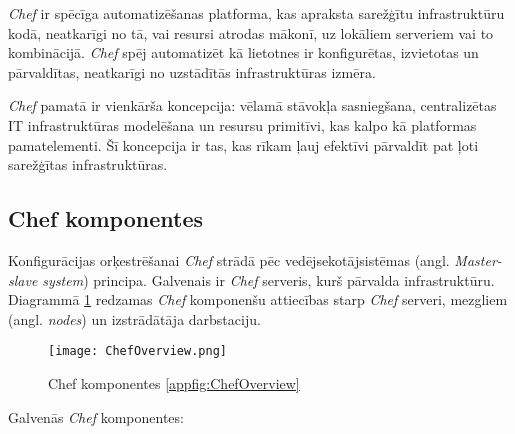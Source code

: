 \textit{Chef} ir spēcīga automatizēšanas platforma, kas apraksta sarežģītu infrastruktūru kodā, neatkarīgi no tā, vai resursi atrodas mākonī, uz lokāliem serveriem vai to kombinācijā. \textit{Chef} spēj automatizēt kā lietotnes ir konfigurētas, izvietotas un pārvaldītas, neatkarīgi no uzstādītās infrastruktūras izmēra.

\textit{Chef} pamatā ir vienkārša koncepcija: vēlamā stāvokļa sasniegšana, centralizētas IT infrastruktūras modelēšana un resursu primitīvi, kas kalpo kā platformas pamatelementi. Šī koncepcija ir tas, kas rīkam ļauj efektīvi pārvaldīt pat ļoti sarežģītas infrastruktūras. \cite{chef-docs}
\subsection{Chef komponentes}
Konfigurācijas orķestrēšanai \textit{Chef} strādā pēc vedējsekotājsistēmas (angl. \textit{Master-slave system}) principa. Galvenais ir \textit{Chef} serveris, kurš pārvalda infrastruktūru.
Diagrammā \ref{fig:ChefOverview} redzamas \textit{Chef} komponenšu attiecības starp \textit{Chef} serveri, mezgliem (angl. \textit{nodes}) un izstrādātāja darbstaciju. \cite{chef-docs}
\begin{figure}[H]%
	\centering
	\captionsetup{justification=centering}
	\texttt{[image: ChefOverview.png]}
	\caption{Chef komponentes \ref{appfig:ChefOverview}}
	\label{fig:ChefOverview}
\end{figure}
Galvenās \textit{Chef} komponentes:
